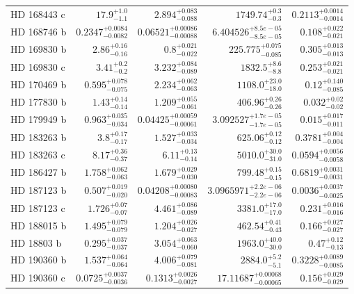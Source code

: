 \begin{longtable*}{lrrrr}
HD 168443 c & $17.9^{+1.0}_{-1.1}$ & $2.894^{+0.083}_{-0.088}$ & $1749.74^{+0.3}_{-0.3}$ & $0.2113^{+0.0014}_{-0.0014}$ \\ 
HD 168746 b & $0.2347^{+0.0084}_{-0.0082}$ & $0.06521^{+0.00086}_{-0.00088}$ & $6.404526^{+8.5e-05}_{-8.5e-05}$ & $0.108^{+0.022}_{-0.021}$ \\ 
HD 169830 b & $2.86^{+0.16}_{-0.16}$ & $0.8^{+0.021}_{-0.022}$ & $225.775^{+0.075}_{-0.085}$ & $0.305^{+0.013}_{-0.013}$ \\ 
HD 169830 c & $3.41^{+0.2}_{-0.2}$ & $3.232^{+0.084}_{-0.089}$ & $1832.5^{+8.6}_{-8.8}$ & $0.253^{+0.021}_{-0.021}$ \\ 
HD 170469 b & $0.595^{+0.078}_{-0.075}$ & $2.234^{+0.062}_{-0.063}$ & $1108.0^{+23.0}_{-18.0}$ & $0.12^{+0.140}_{-0.085}$ \\ 
HD 177830 b & $1.43^{+0.14}_{-0.14}$ & $1.209^{+0.055}_{-0.061}$ & $406.96^{+0.26}_{-0.26}$ & $0.032^{+0.02}_{-0.02}$ \\ 
HD 179949 b & $0.963^{+0.035}_{-0.034}$ & $0.04425^{+0.00059}_{-0.00061}$ & $3.092527^{+1.7e-05}_{-1.7e-05}$ & $0.015^{+0.017}_{-0.011}$ \\ 
HD 183263 b & $3.8^{+0.17}_{-0.17}$ & $1.527^{+0.033}_{-0.034}$ & $625.06^{+0.12}_{-0.12}$ & $0.3781^{+0.004}_{-0.004}$ \\ 
HD 183263 c & $8.17^{+0.36}_{-0.37}$ & $6.11^{+0.13}_{-0.14}$ & $5010.0^{+30.0}_{-31.0}$ & $0.0594^{+0.0056}_{-0.0058}$ \\ 
HD 186427 b & $1.758^{+0.062}_{-0.063}$ & $1.679^{+0.029}_{-0.030}$ & $799.48^{+0.15}_{-0.15}$ & $0.6819^{+0.0031}_{-0.0031}$ \\ 
HD 187123 b & $0.507^{+0.019}_{-0.020}$ & $0.04208^{+0.00080}_{-0.00083}$ & $3.0965971^{+2.2e-06}_{-2.2e-06}$ & $0.0036^{+0.0037}_{-0.0025}$ \\ 
HD 187123 c & $1.726^{+0.07}_{-0.07}$ & $4.461^{+0.086}_{-0.089}$ & $3381.0^{+17.0}_{-17.0}$ & $0.231^{+0.016}_{-0.016}$ \\ 
HD 188015 b & $1.495^{+0.079}_{-0.079}$ & $1.204^{+0.026}_{-0.027}$ & $462.54^{+0.41}_{-0.43}$ & $0.166^{+0.027}_{-0.027}$ \\ 
HD 18803 b & $0.295^{+0.037}_{-0.037}$ & $3.054^{+0.063}_{-0.060}$ & $1963.0^{+40.0}_{-30.0}$ & $0.47^{+0.12}_{-0.13}$ \\ 
HD 190360 b & $1.537^{+0.064}_{-0.064}$ & $4.006^{+0.079}_{-0.081}$ & $2884.0^{+5.2}_{-5.1}$ & $0.3228^{+0.0089}_{-0.0085}$ \\ 
HD 190360 c & $0.0725^{+0.0037}_{-0.0036}$ & $0.1313^{+0.0026}_{-0.0027}$ & $17.11687^{+0.00068}_{-0.00065}$ & $0.156^{+0.029}_{-0.029}$ \\ 

\end{longtable*}
